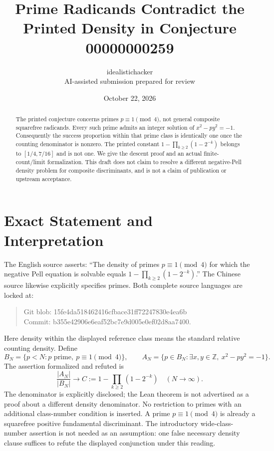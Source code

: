 \documentclass[11pt]{article}
\title{Prime Radicands Contradict the Printed Density\newline
  in Conjecture 00000000259}
\author{idealistichacker\\\small AI-assisted submission prepared for review}
\date{October 22, 2026}
\newcommand{\Z}{\mathbb Z}
\begin{document}
\maketitle
\begin{abstract}
The printed conjecture concerns primes $p\equiv1\pmod4$, not general composite
squarefree radicands. Every such prime admits an integer solution of
$x^2-py^2=-1$. Consequently the success proportion within that prime class is
identically one once the counting denominator is nonzero. The printed constant
$1-\prod_{k\ge2}(1-2^{-k})$ belongs to $[1/4,7/16]$ and is not one. We give the
descent proof and an actual finite-count/limit formalization. This draft does
not claim to resolve a different negative-Pell density problem for composite
discriminants, and is not a claim of publication or upstream acceptance.
\end{abstract}

\section{Exact Statement and Interpretation}
The English source asserts: ``The density of primes $p\equiv1\pmod4$ for which
the negative Pell equation is solvable equals
$1-\prod_{k\ge2}(1-2^{-k})$.'' The Chinese source likewise explicitly specifies
primes. Both complete source languages are locked at:
\begin{quote}\small\ttfamily
Git blob: 15fe4da518462416cfbace31ff72247830e4ea6b\\
Commit: b355e42906e6eaf52bc7e9d005e0ef02d8aa7400.
\end{quote}

Here density within the displayed reference class means the standard relative
counting density. Define
\[
 B_N=\{p<N:p\text{ prime},\ p\equiv1\pmod4\},\qquad
 A_N=\{p\in B_N:\exists x,y\in\Z,\ x^2-py^2=-1\}.
\]
The assertion formalized and refuted is
\[
 \frac{|A_N|}{|B_N|}\longrightarrow
 C:=1-\prod_{k\ge2}(1-2^{-k})\quad(N\longrightarrow\infty).
\]
The denominator is explicitly disclosed; the Lean theorem is not advertised as
a proof about a different density denominator. No restriction to primes with
an additional class-number condition is inserted. A prime $p\equiv1\pmod4$
is already a squarefree positive fundamental discriminant. The introductory
wide-class-number assertion is not needed as an assumption: one false necessary
density clause suffices to refute the displayed conjunction under this reading.
\end{document}
